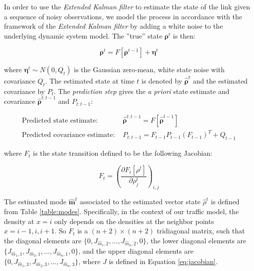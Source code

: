 In order to use the \textit{Extended Kalman filter} to estimate the state of the link given a sequence of noisy observations, we model the process in accordance with the framework of the \textit{Extended Kalman filter} by adding a white noise to the underlying dynamic system model. The ''true'' state $\boldsymbol\rho^{t}$ is then:

\begin{equation}
\boldsymbol\rho^{t} = F[\boldsymbol\rho^{t-1}] + \boldsymbol\eta^{t}
\label{eq:underlyingSystem3}
\end{equation}

\noindent where $\boldsymbol\eta^{t}\sim N(0,Q_{t})$ is the Gaussian zero-mean, white state noise with covariance $Q_{t}$. The estimated state at time $t$ is denoted by $\hat{\boldsymbol\rho}^{t}$ and the estimated covariance by $P_{t}$. The \textit{prediction step} gives the \textit{a priori} state estimate and covariance $\hat{\boldsymbol\rho}^{t:t-1}$ and $P_{t:t-1}$:

\begin{equation}
\begin{array}{ll}
\text{Predicted state estimate: } & \hat{\boldsymbol\rho}^{t:t-1} = F[\hat{\boldsymbol\rho}^{t-1}]\\
\text{Predicted covariance estimate: } & P_{t:t-1} = F_{t-1}P_{t-1}(F_{t-1})^{T} + Q_{t-1}
\end{array}
\end{equation}

\noindent where $F_{t}$ is the state transition defined to be the following Jacobian:

\begin{equation}
F_{t} = \left(\frac{\partial F_{i}[\rho^{t}]}{\partial \rho^{t}_{j}}\right)_{i,j}
\label{eq:jacobian2}
\end{equation}

The estimated mode $\hat{\boldsymbol m}^{t}$ associated to the estimated vector state $\hat{\rho}^{t}$ is defined from Table \ref{table:modes}. Specifically, in the context of our traffic model, the density at $x=i$ only depends on the densities at the neighbor points $x=i-1,i,i+1$. So $F_{t}$ is a $(n+2)\times(n+2)$ tridiagonal matrix, such that the diagonal elements are $\{0, J_{\hat{m}_{1},2},...,J_{\hat{m}_{n},2},0\}$, the lower diagonal elements are $\{J_{\hat{m}_{1},1},J_{\hat{m}_{2},1},...,J_{\hat{m}_{n},1},0\}$, and the upper diagonal elements are $\{0,J_{\hat{m}_{1},3},J_{\hat{m}_{2},3},...,J_{\hat{m}_{n},3}\}$, where $J$ is defined in Equation \ref{eq:jacobian}. 

